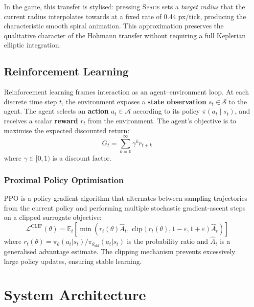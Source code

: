 \documentclass[12pt]{article}
\begin{document}
In the game, this transfer is stylised: pressing \textsc{Space} sets a \textit{target radius} that the current radius interpolates towards at a fixed rate of 0.44 px/tick, producing the characteristic smooth spiral animation. This approximation preserves the qualitative character of the Hohmann transfer without requiring a full Keplerian elliptic integration.

\subsection{Reinforcement Learning}

Reinforcement learning frames interaction as an agent--environment loop. At each discrete time step $t$, the environment exposes a \textbf{state observation} $s_t \in \mathcal{S}$ to the agent. The agent selects an \textbf{action} $a_t \in \mathcal{A}$ according to its policy $\pi(a_t \mid s_t)$, and receives a scalar \textbf{reward} $r_t$ from the environment. The agent's objective is to maximise the expected discounted return:
\begin{equation}
    G_t = \sum_{k=0}^{\infty} \gamma^k r_{t+k}
\end{equation}
where $\gamma \in [0, 1)$ is a discount factor.

\subsubsection*{Proximal Policy Optimisation}

PPO \cite{schulman2017proximal} is a policy-gradient algorithm that alternates between sampling trajectories from the current policy and performing multiple stochastic gradient-ascent steps on a clipped surrogate objective:
\begin{equation}
    \mathcal{L}^{\text{CLIP}}(\theta) = \mathbb{E}_t\!\left[\min\!\left(
        r_t(\theta)\hat{A}_t,\;
        \text{clip}\!\left(r_t(\theta), 1-\varepsilon, 1+\varepsilon\right)\hat{A}_t
        \right)\right]
\end{equation}
where $r_t(\theta) = \pi_\theta(a_t|s_t)/\pi_{\theta_{\text{old}}}(a_t|s_t)$ is the probability ratio and $\hat{A}_t$ is a generalised advantage estimate. The clipping mechanism prevents excessively large policy updates, ensuring stable learning.

\section{System Architecture}
\end{document}
